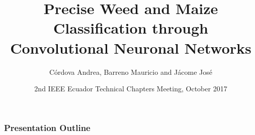 \documentclass[10pt,a4paper]{beamer}
\begin{document}
\title[Precise Weed and Maize Classification through Convolutional Neuronal Networks] %
{Precise Weed and Maize Classification through
Convolutional Neuronal Networks}
 
 
\author[C\'ordova Andrea, Barreno Mauricio and J\'acome Jos\'e] %
{C\'ordova Andrea, Barreno Mauricio and J\'acome Jos\'e}
 
 
\date[Ecuador] %
{2nd IEEE Ecuador Technical Chapters Meeting, October 2017}
\frame{\titlepage}
\begin{frame}
\frametitle{Presentation Outline}
\tableofcontents
\end{frame}
\end{document}
